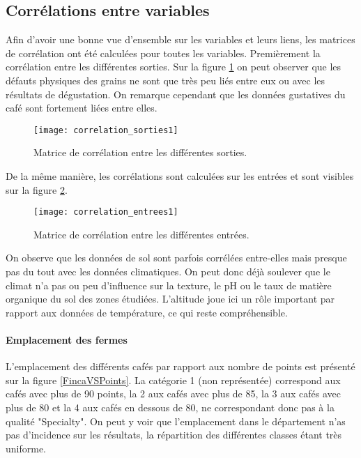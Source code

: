 \subsection{Corrélations entre variables}

Afin d'avoir une bonne vue d'ensemble sur les variables et leurs liens, les matrices de corrélation ont été calculées pour toutes les variables. Premièrement la corrélation entre les différentes sorties. Sur la figure \ref{correlation_sorties1} on peut observer que les défauts physiques des grains ne sont que très peu liés entre eux ou avec les résultats de dégustation. On remarque cependant que les données gustatives du café sont fortement liées entre elles. 

\begin{figure}[H]
	\texttt{[image: correlation\_sorties1]}
	\caption{\label{correlation_sorties1} Matrice de corrélation entre les différentes sorties.}
\end{figure}


De la même manière, les corrélations sont calculées sur les entrées et sont visibles sur la figure \ref{correlation_entrees1}. 


\begin{figure}[H]
	\texttt{[image: correlation\_entrees1]}
	\caption{\label{correlation_entrees1} Matrice de corrélation entre les différentes entrées.}
\end{figure}


On observe que les données de sol sont parfois corrélées entre-elles mais presque pas du tout avec les données climatiques. On peut donc déjà soulever que le climat n'a pas ou peu d'influence sur la texture, le pH ou le taux de matière organique du sol des zones étudiées. L'altitude joue ici un rôle important par rapport aux données de température, ce qui reste compréhensible. 





\paragraph{Emplacement des fermes} L'emplacement des différents cafés par rapport aux nombre de points est présenté sur la figure \ref{FincaVSPoints}. La catégorie 1 (non représentée) correspond aux cafés avec plus de 90 points, la 2 aux cafés avec plus de 85, la 3 aux cafés avec plus de 80 et la 4 aux cafés en dessous de 80, ne correspondant donc pas à la qualité "Specialty". On peut y voir que l'emplacement dans le département n'as pas d'incidence sur les résultats, la répartition des différentes classes étant très uniforme. 


